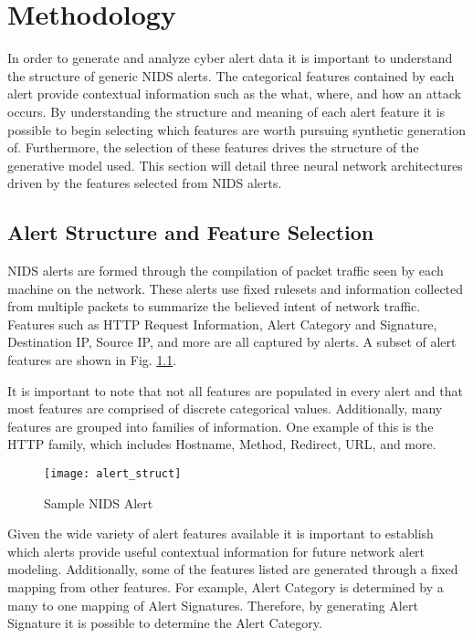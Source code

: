 \chapter{Methodology}
\label{sec:meth}

In order to generate and analyze cyber alert data it is important to understand the structure of generic NIDS alerts. The categorical features contained by each alert provide contextual information such as the what, where, and how an attack occurs. By understanding the structure and meaning of each alert feature it is possible to begin selecting which features are worth pursuing synthetic generation of. Furthermore, the selection of these features drives the structure of the generative model used. This section will detail three neural network architectures driven by the features selected from NIDS alerts. 

\section{Alert Structure and Feature Selection}

NIDS alerts are formed through the compilation of packet traffic seen by each machine on the network. These alerts use fixed rulesets and information collected from multiple packets to summarize the believed intent of network traffic. Features such as HTTP Request Information, Alert Category and Signature, Destination IP, Source IP, and more are all captured by alerts. A subset of alert features are shown in Fig. \ref{fig:alert}. 

It is important to note that not all features are populated in every alert and that most features are comprised of discrete categorical values. Additionally, many features are grouped into families of information. One example of this is the HTTP family, which includes Hostname, Method, Redirect, URL, and more.

\begin{figure}
	\centering
	\texttt{[image: alert\_struct]}
	\caption{Sample NIDS Alert}
	\label{fig:alert}
\end{figure}

Given the wide variety of alert features available it is important to establish which alerts provide useful contextual information for future network alert modeling. Additionally, some of the features listed are generated through a fixed mapping from other features. For example, Alert Category is determined by a many to one mapping of Alert Signatures. Therefore, by generating Alert Signature it is possible to determine the Alert Category. 

